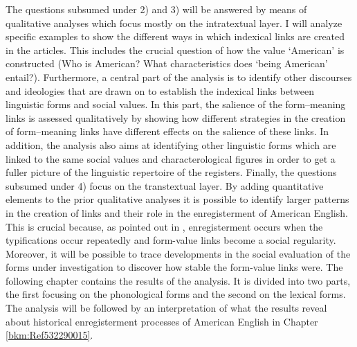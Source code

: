 The questions subsumed under 2) and 3) will be answered by means of qualitative analyses which focus mostly on the intratextual layer. I will analyze specific examples to show the different ways in which indexical links are created in the articles. This includes the crucial question of how the value ‘American’ is constructed (Who is American? What characteristics does ‘being American’ entail?). Furthermore, a central part of the analysis is to identify other discourses and ideologies that are drawn on to establish the indexical links between linguistic forms and social values. In this part, the salience of the form–meaning links is assessed qualitatively by showing how different strategies in the creation of form–meaning links have different effects on the salience of these links. In addition, the analysis also aims at identifying other linguistic forms which are linked to the same social values and characterological figures in order to get a fuller picture of the linguistic repertoire of the registers. Finally, the questions subsumed under 4) focus on the transtextual layer. By adding quantitative elements to the prior qualitative analyses it is possible to identify larger patterns in the creation of links and their role in the enregisterment of American English. This is crucial because, as pointed out in , enregisterment occurs when the typifications occur repeatedly and form-value links become a social regularity. Moreover, it will be possible to trace developments in the social evaluation of the forms under investigation to discover how stable the form-value links were. The following chapter contains the results of the analysis. It is divided into two parts, the first focusing on the phonological forms and the second on the lexical forms. The analysis will be followed by an interpretation of what the results reveal about historical enregisterment processes of American English in Chapter \ref{bkm:Ref532290015}.

